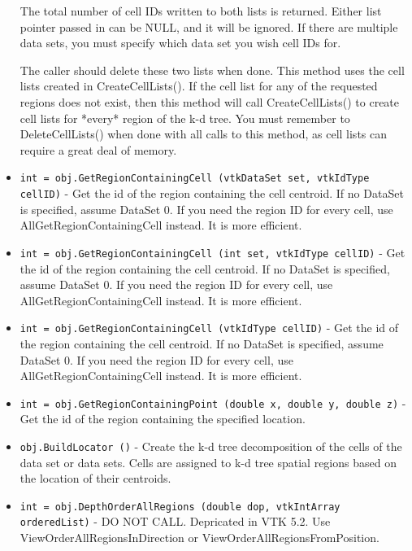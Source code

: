 \begin{itemize}
   The total number of cell IDs written to both lists is returned.
   Either list pointer passed in can be NULL, and it will be ignored.
   If there are multiple data sets, you must specify which data set
   you wish cell IDs for.

   The caller should delete these two lists when done.  This method
   uses the cell lists created in CreateCellLists().
   If the cell list for any of the requested regions does not
   exist, then this method will call CreateCellLists() to create
   cell lists for *every* region of the k-d tree.  You must remember 
   to DeleteCellLists() when done with all calls to this method, as 
   cell lists can require a great deal of memory.

\item  \verb|int = obj.GetRegionContainingCell (vtkDataSet set, vtkIdType cellID)| -     Get the id of the region containing the cell centroid.  If
    no DataSet is specified, assume DataSet 0.  If you need the
    region ID for every cell, use AllGetRegionContainingCell
    instead.  It is more efficient.

\item  \verb|int = obj.GetRegionContainingCell (int set, vtkIdType cellID)| -     Get the id of the region containing the cell centroid.  If
    no DataSet is specified, assume DataSet 0.  If you need the
    region ID for every cell, use AllGetRegionContainingCell
    instead.  It is more efficient.

\item  \verb|int = obj.GetRegionContainingCell (vtkIdType cellID)| -     Get the id of the region containing the cell centroid.  If
    no DataSet is specified, assume DataSet 0.  If you need the
    region ID for every cell, use AllGetRegionContainingCell
    instead.  It is more efficient.

\item  \verb|int = obj.GetRegionContainingPoint (double x, double y, double z)| -     Get the id of the region containing the specified location.

\item  \verb|obj.BuildLocator ()| -  Create the k-d tree decomposition of the cells of the data set
 or data sets.  Cells are assigned to k-d tree spatial regions
 based on the location of their centroids.

\item  \verb|int = obj.DepthOrderAllRegions (double dop, vtkIntArray orderedList)| -  DO NOT CALL.  Depricated in VTK 5.2.  Use ViewOrderAllRegionsInDirection
 or ViewOrderAllRegionsFromPosition.


\end{itemize}
